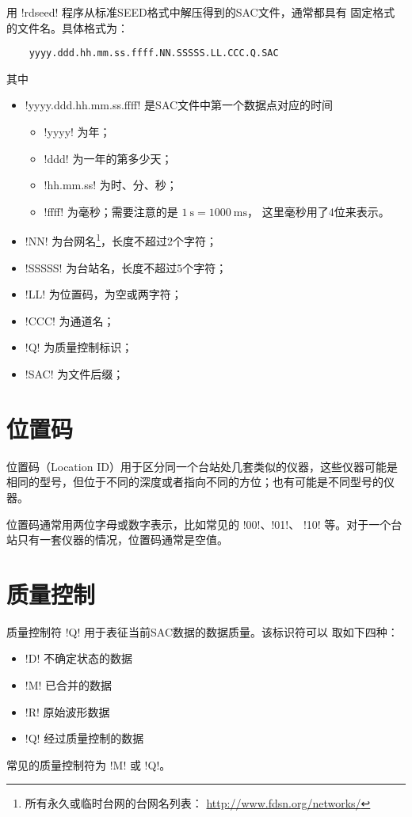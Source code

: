 用 !rdseed! 程序从标准SEED格式中解压得到的SAC文件，通常都具有
固定格式的文件名。具体格式为：
\begin{verbatim}
    yyyy.ddd.hh.mm.ss.ffff.NN.SSSSS.LL.CCC.Q.SAC
\end{verbatim}
其中
\begin{itemize}
\item !yyyy.ddd.hh.mm.ss.ffff! 是SAC文件中第一个数据点对应的时间
    \begin{itemize}
    \item !yyyy! 为年；
    \item !ddd! 为一年的第多少天；
    \item !hh.mm.ss! 为时、分、秒；
    \item !ffff! 为毫秒；需要注意的是 $\SI{1}{\s}=\SI{1000}{\ms}$，
        这里毫秒用了4位来表示。
    \end{itemize}
\item !NN! 为台网名\footnote{所有永久或临时台网的台网名列表：
    \url{http://www.fdsn.org/networks/}}，长度不超过2个字符；
\item !SSSSS! 为台站名，长度不超过5个字符；
\item !LL! 为位置码，为空或两字符；
\item !CCC! 为通道名；
\item !Q! 为质量控制标识；
\item !SAC! 为文件后缀；
\end{itemize}

\section{位置码}
位置码（Location ID）用于区分同一个台站处几套类似的仪器，这些仪器可能是
相同的型号，但位于不同的深度或者指向不同的方位；也有可能是不同型号的仪器。

位置码通常用两位字母或数字表示，比如常见的 !00!、!01!、
!10! 等。对于一个台站只有一套仪器的情况，位置码通常是空值。

\section{质量控制}
\label{sec:quality-control}
质量控制符 !Q! 用于表征当前SAC数据的数据质量。该标识符可以
取如下四种：
\begin{itemize}
\item !D! 不确定状态的数据
\item !M! 已合并的数据
\item !R! 原始波形数据
\item !Q! 经过质量控制的数据
\end{itemize}
常见的质量控制符为 !M! 或 !Q!。

